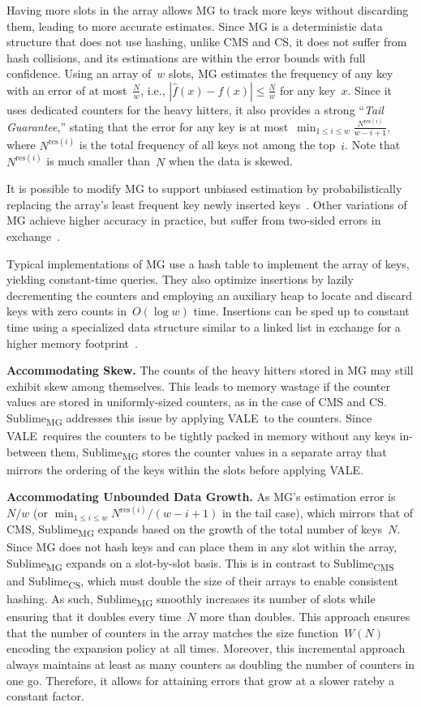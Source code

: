 \documentclass[sigconf]{acmart}
\newcommand{\sketch}{Sublime}
\newcommand{\sketchcms}{\sketch\textsubscript{CMS}\xspace}
\newcommand{\sketchcs}{\sketch\textsubscript{CS}\xspace}
\newcommand{\sketchmg}{\sketch\textsubscript{MG}\xspace}
\newcommand{\counterencodingabbrv}{VALE}
\begin{document}
Having more slots in the array allows MG to track more keys without discarding
them, leading to more accurate estimates. Since MG is a deterministic data
structure that does not use hashing, unlike CMS and CS, it does not suffer from
hash collisions, and its estimations are within the error bounds with full
confidence. Using an array of~$w$ slots, MG estimates the frequency of any key
with an error of at most~$\frac{N}{w}$, i.e., $|\hat{f}(x)-f(x)| \leq
\frac{N}{w}$ for any key~$x$. Since it uses dedicated counters for the heavy
hitters, it also provides a strong ``\emph{Tail Guarantee},'' stating that the
error for any key is at most~$\min_{1 \leq i \leq w}
\frac{N^{\text{res}(i)}}{w-i+1}$, where $N^{\text{res}(i)}$ is the total
frequency of all keys not among the top~$i$. Note that~$N^{\text{res}(i)}$ is
much smaller than~$N$ when the data is skewed.

It is possible to modify MG to support unbiased estimation by probabilistically
replacing the array's least frequent key newly inserted
keys~\cite{UnbiasedSpaceSaving}. Other variations of MG achieve higher accuracy
in practice, but suffer from two-sided errors in exchange~\cite{SpaceSaving}.

Typical implementations of MG use a hash table to implement the array of keys,
yielding constant-time queries. They also optimize insertions by lazily
decrementing the counters and employing an auxiliary heap to locate and discard
keys with zero counts in~$O(\log w)$ time. Insertions can be sped up to
constant time using a specialized data structure similar to a linked list in
exchange for a higher memory footprint~\cite{SpaceSaving}.

\textbf{Accommodating Skew.}
The counts of the heavy hitters stored in MG may still exhibit skew among
themselves. This leads to memory wastage if the counter values are stored in
uniformly-sized counters, as in the case of CMS and CS. \sketchmg addresses
this issue by applying \counterencodingabbrv\ to the counters. Since
\counterencodingabbrv\ requires the counters to be tightly packed in memory
without any keys in-between them, \sketchmg stores the counter values in a
separate array that mirrors the ordering of the keys within the slots before
applying \counterencodingabbrv.

\textbf{Accommodating Unbounded Data Growth.}
As MG's estimation error is~$N/w$ (or $\min_{1 \leq i \leq w}
N^{\text{res}(i)}/(w-i+1)$ in the tail case), which mirrors that of CMS,
\sketchmg expands based on the growth of the total number of keys~$N$. Since MG
does not hash keys and can place them in any slot within the array, \sketchmg
expands on a slot-by-slot basis. This is in contrast to \sketchcms and
\sketchcs, which must double the size of their arrays to enable consistent
hashing. As such, \sketchmg smoothly increases its number of slots while
ensuring that it doubles every time~$N$ more than doubles. This approach
ensures that the number of counters in the array matches the size
function~$W(N)$ encoding the expansion policy at all times. Moreover, this
incremental approach always maintains at least as many counters as doubling the
number of counters in one go. Therefore, it allows for attaining errors that
grow at a slower rate{\textemdash}by a constant factor.
\end{document}
